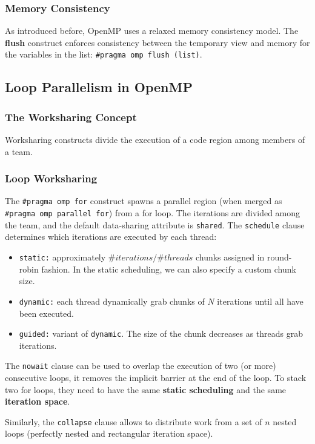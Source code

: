 \subsubsection{Memory Consistency}

As introduced before, OpenMP uses a relaxed memory consistency model.
The \textbf{flush} construct enforces consistency between the temporary view and memory for the variables in the list: \texttt{\#pragma omp flush (list)}.

\subsection{Loop Parallelism in OpenMP}

\subsubsection{The Worksharing Concept}
Worksharing constructs divide the execution of a code region among members of a team.

\subsubsection{Loop Worksharing}
The \texttt{\#pragma omp for} construct spawns a parallel region (when merged as \texttt{\#pragma omp parallel for}) from a for loop.
The iterations are divided among the team, and the default data-sharing attribute is \texttt{shared}.
The \texttt{schedule} clause determines which iterations are executed by each thread:
\begin{itemize}
    \item \texttt{static:} approximately $\#iterations / \#threads$ chunks assigned in round-robin fashion. In the static scheduling, we can also specify a custom chunk size.
    \item \texttt{dynamic:} each thread dynamically grab chunks of $N$ iterations until all have been executed.
    \item \texttt{guided:} variant of \texttt{dynamic}. The size of the chunk decreases as threads grab iterations.
\end{itemize}

The \texttt{nowait} clause can be used to overlap the execution of two (or more) consecutive loops, it removes the implicit barrier at the end of the loop.
To stack two for loops, they need to have the same \textbf{static scheduling} and the same \textbf{iteration space}.

Similarly, the \texttt{collapse} clause allows to distribute work from a set of $n$ nested loops (perfectly nested and rectangular iteration space).

